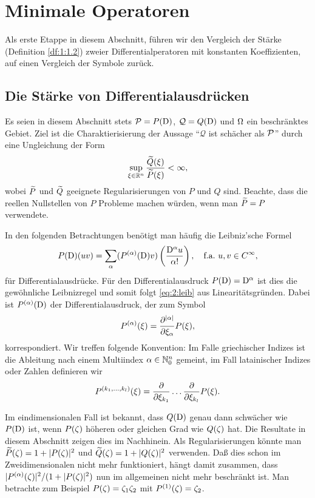 \chapter{Minimale Operatoren}

Als erste Etappe in diesem Abschnitt,
führen wir den Vergleich der Stärke (Definition \ref{df:1:1.2})
zweier Differentialperatoren mit konstanten Koeffizienten,
auf einen Vergleich der Symbole zurück.

\section{Die Stärke von Differentialausdrücken}

Es seien in diesem Abschnitt stets $\mathcal P=P(\mathrm D)$,
$\mathcal Q=Q(\mathrm D)$ und $\Omega$ ein beschränktes Gebiet.
Ziel ist die Charaktierisierung der Aussage ``$\mathcal Q$ ist schächer als $\mathcal P$''
durch eine Ungleichung der Form
\begin{equation}\label{eq:2:1}
\sup_{\xi\in\mathbb R^n}\frac{\widetilde{Q}(\xi)}{\widetilde{P}(\xi)}<\infty,
\end{equation}
wobei $\widetilde{P}$ und $\widetilde{Q}$ geeignete Regularisierungen von $P$ und $Q$ sind.
Beachte, dass die reellen Nullstellen von $P$ Probleme machen würden,
wenn man $\widetilde{P}=P$ verwendete.

In den folgenden Betrachtungen benötigt man häufig die Leibniz'sche Formel
\begin{equation}\label{eq:2:leib}
P(\mathrm D)(uv)=\sum_{\alpha}(P^{(\alpha)}(\mathrm D)v)\left(\frac{\mathrm D^\alpha u}{\alpha!}\right),
\quad\text{f.a.}~u,v\in C^\infty,
\end{equation}
für Differentialausdrücke.
Für den Differentialausdruck $P(\mathrm D)=\mathrm D^\alpha$
ist dies die gewöhnliche Leibnizregel
und somit folgt \eqref{eq:2:leib} aus Linearitätsgründen.
Dabei ist $P^{(\alpha)}(\mathrm D)$ der Differentialausdruck,
der zum Symbol
\begin{equation}
P^{(\alpha)}(\xi)=\frac{\partial^{\lvert\alpha\rvert}}{\partial\xi_\alpha}P(\xi),
\end{equation}
korrespondiert.
Wir treffen folgende Konvention:
Im Falle griechischer Indizes
ist die Ableitung nach einem Multiindex $\alpha\in\mathbb N^n_0$ gemeint,
im Fall latainischer Indizes oder Zahlen definieren wir
\begin{equation}
P^{(k_1,\dots,k_l)}(\xi)=\frac{\partial}{\partial\xi_{k_1}}\dots\frac{\partial}{\partial\xi_{k_l}}P(\xi).
\end{equation}

Im eindimensionalen Fall ist bekannt, dass $Q(\mathrm D)$ genau dann schwächer wie $P(\mathrm D)$ ist,
wenn $P(\zeta)$ höheren oder gleichen Grad wie $Q(\zeta)$ hat.
Die Resultate in diesem Abschnitt zeigen dies im Nachhinein.
Als Regularisierungen könnte man $\widetilde{P}(\zeta)=1+\lvert P(\zeta)\rvert^2$
und $\widetilde{Q}(\zeta)=1+\lvert Q(\zeta)\rvert^2$ verwenden.
Daß dies schon im Zweidimensionalen nicht mehr funktioniert,
hängt damit zusammen, dass $\lvert P^{(\alpha)}(\zeta)\rvert^2/(1+\lvert P(\zeta)\rvert^2)$
nun im allgemeinen nicht mehr beschränkt ist.
Man betrachte zum Beispiel $P(\zeta)=\zeta_1\zeta_2$ mit $P^{(1)}(\zeta)=\zeta_2$.

